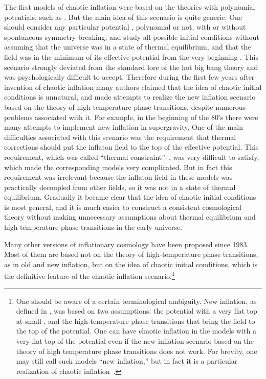 \documentclass[a4paper,12pt]{article}
\begin{document}
The first models of chaotic inflation were based on the theories with
polynomial potentials, such as \coordHE{}. But the main idea of this scenario is quite
generic. One should consider any particular potential \coordHE{},
polynomial or not, with or without spontaneous symmetry breaking, and
study all possible initial conditions without assuming that the universe
was in a state of thermal equilibrium, and that the field \myHighlight{$\phi$}\coordHE{} was in
the minimum of its effective potential from the very beginning
\cite{Chaot}. This scenario strongly deviated from the standard lore of
the hot big bang theory and was psychologically difficult to accept.
Therefore during the first few years after invention of chaotic inflation
many authors claimed that the idea of chaotic initial conditions is
unnatural, and made attempts to realize the new inflation scenario based
on the theory of high-temperature phase transitions, despite numerous
problems associated with it. For example, in the beginning of the 80's there were many attempts to implement new inflation in supergravity. One of the main difficulties associated with this scenario was the requirement that thermal corrections should put the inflaton field to the top of the effective potential. This requirement, which was called ``thermal constraint''~\cite{OvrutSteinhardt}, was very difficult to satisfy, which made the corresponding models very complicated. But in fact this requirement was  irrelevant because the inflaton field in these models was practically decoupled from other fields, so it was not in a state of thermal equilibrium.  Gradually  it became clear that the
idea of chaotic initial conditions is most general, and   it is much
easier to construct a consistent cosmological theory without making
unnecessary assumptions about thermal equilibrium and high temperature
phase transitions in the early universe.


Many other versions of inflationary cosmology have been proposed since
1983. Most of them are based not  on the  theory of high-temperature
phase transitions, as in old and new inflation, but on the idea of
chaotic initial conditions, which is the definitive feature of the
chaotic inflation scenario.\footnote{One should be aware of a certain terminological ambiguity. New inflation, as defined in \cite{New}, was based on two assumptions:  the potential with a very flat top at small \myHighlight{$\phi$}\coordHE{}, and the high-temperature phase transitions that bring the field to the top of the potential.  One can have chaotic inflation in the models with a very flat top of the potential even if the new inflation scenario based on the theory of high temperature phase transitions does not work. For brevity, one may still call such models ``new inflation,'' but in fact it is a particular realization of chaotic inflation~\cite{primordial}. }
\end{document}
